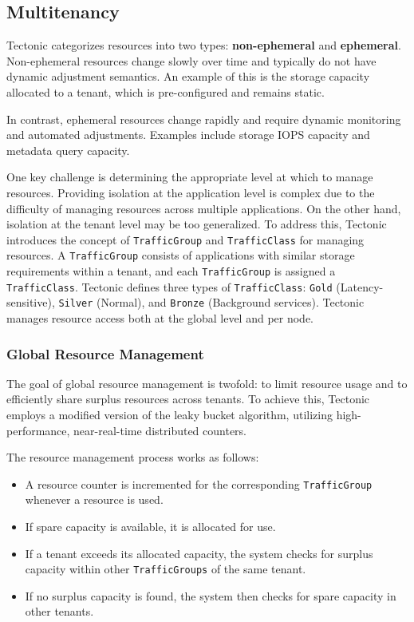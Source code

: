 \subsection{Multitenancy}\label{sec:multitenancy}

Tectonic categorizes resources into two types: \textbf{non-ephemeral} and \textbf{ephemeral}. Non-ephemeral resources change slowly over time and typically do not have dynamic adjustment semantics. An example of this is the storage capacity allocated to a tenant, which is pre-configured and remains static.

In contrast, ephemeral resources change rapidly and require dynamic monitoring and automated adjustments. Examples include storage IOPS capacity and metadata query capacity.

One key challenge is determining the appropriate level at which to manage resources. Providing isolation at the application level is complex due to the difficulty of managing resources across multiple applications. On the other hand, isolation at the tenant level may be too generalized. To address this, Tectonic introduces the concept of \texttt{TrafficGroup} and \texttt{TrafficClass} for managing resources. A \texttt{TrafficGroup} consists of applications with similar storage requirements within a tenant, and each \texttt{TrafficGroup} is assigned a \texttt{TrafficClass}. Tectonic defines three types of \texttt{TrafficClass}: \texttt{Gold} (Latency-sensitive), \texttt{Silver} (Normal), and \texttt{Bronze} (Background services). Tectonic manages resource access both at the global level and per node.

\subsubsection{Global Resource Management}\label{sec:global_resource_management}

The goal of global resource management is twofold: to limit resource usage and to efficiently share surplus resources across tenants. To achieve this, Tectonic employs a modified version of the leaky bucket algorithm, utilizing high-performance, near-real-time distributed counters.

The resource management process works as follows:

\begin{itemize}\label{list:resource_management}
    \item A resource counter is incremented for the corresponding \texttt{TrafficGroup} whenever a resource is used.
    \item If spare capacity is available, it is allocated for use.
    \item If a tenant exceeds its allocated capacity, the system checks for surplus capacity within other \texttt{TrafficGroups} of the same tenant.
    \item If no surplus capacity is found, the system then checks for spare capacity in other tenants.
\end{itemize}

